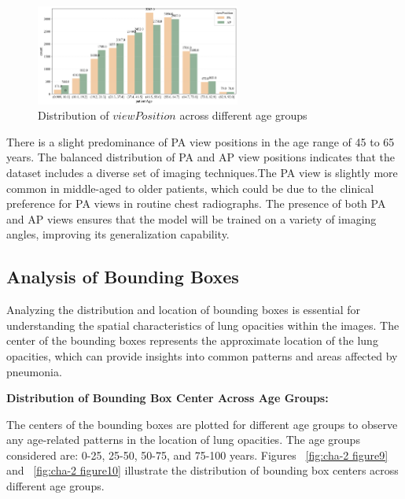 \begin{figure}[H]
    \begin{center}
        \includegraphics[width = 0.6\textwidth]{figures/Figure9.png}
        \caption{Distribution of $viewPosition$ across different age groups}
        \label{fig:cha-2 figure8}
    \end{center}
\end{figure}

There is a slight predominance of PA view positions in the age range of 45 to 65 years. The balanced distribution of PA and AP view positions indicates that the dataset includes a diverse set of imaging techniques.The PA view is slightly more common in middle-aged to older patients, which could be due to the clinical preference for PA views in routine chest radiographs. The presence of both PA and AP views ensures that the model will be trained on a variety of imaging angles, improving its generalization capability.

\subsection{Analysis of Bounding Boxes}
\label{subsec:chap2 section 1.4}

Analyzing the distribution and location of bounding boxes is essential for understanding the spatial characteristics of lung opacities within the images. The center of the bounding boxes represents the approximate location of the lung opacities, which can provide insights into common patterns and areas affected by pneumonia.

\textbf{Distribution of Bounding Box Center Across Age Groups:}

The centers of the bounding boxes are plotted for different age groups to observe any age-related patterns in the location of lung opacities. The age groups considered are: 0-25, 25-50, 50-75, and 75-100 years. Figures ~\ref{fig:cha-2 figure9} and ~\ref{fig:cha-2 figure10} illustrate the distribution of bounding box centers across different age groups.

